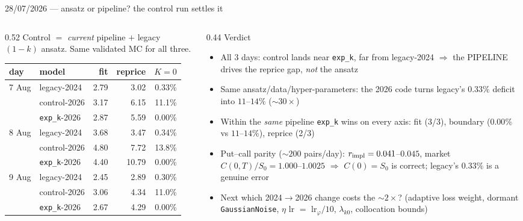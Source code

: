 \documentclass[aspectratio=169,11pt]{beamer}
\newcommand{\gold}[1]{{\color{ntugold}#1}}
\newcommand{\red}[1]{{\color{ntured}#1}}
\begin{document}
\begin{frame}{28/07/2026 --- ansatz or pipeline? the control run settles it}
  \begin{columns}[T]
    \begin{column}{0.52\linewidth}
      \gold{Control} $=$ \emph{current} pipeline $+$ legacy $(1{-}k)$ ansatz.
      Same validated MC for all three.
      \begin{center}\scriptsize
      \begin{tabular}{llrrr}
        \toprule
        day & model & fit & reprice & $K{=}0$ \\
        \midrule
        7 Aug & legacy-2024  & 2.79 & \gold{3.02} & 0.33\% \\
              & control-2026 & 3.17 & \red{6.15}  & 11.1\% \\
              & \texttt{exp\_k}-2026 & 2.87 & \red{5.59} & 0.00\% \\
        \midrule
        8 Aug & legacy-2024  & 3.68 & \gold{3.47} & 0.34\% \\
              & control-2026 & 4.80 & \red{7.72}  & 13.8\% \\
              & \texttt{exp\_k}-2026 & 4.40 & \red{10.79} & 0.00\% \\
        \midrule
        9 Aug & legacy-2024  & 2.45 & \gold{2.89} & 0.30\% \\
              & control-2026 & 3.06 & \red{4.34}  & 11.0\% \\
              & \texttt{exp\_k}-2026 & 2.67 & \red{4.29} & 0.00\% \\
        \bottomrule
      \end{tabular}
      \end{center}
    \end{column}
    \begin{column}{0.44\linewidth}
      \gold{Verdict}
      \begin{itemize}\scriptsize
        \item All 3 days: control lands \red{near \texttt{exp\_k}, far from legacy-2024}
              $\Rightarrow$ the \red{PIPELINE} drives the reprice gap, \emph{not} the ansatz
        \item Same ansatz/data/hyper-parameters: the 2026 code turns legacy's $0.33\%$ deficit into
              \red{$11$--$14\%$} ($\sim\!30\times$)
        \item Within the \emph{same} pipeline \texttt{exp\_k} wins on \gold{every} axis: fit (3/3),
              boundary ($0.00\%$ vs $11$--$14\%$), reprice (2/3)
        \item Put--call parity ($\sim\!200$ pairs/day): $r_{\rm impl}=0.041$--$0.045$,
              market $C(0,T)/S_0=1.000$--$1.0025$ $\Rightarrow$ \gold{$C(0)=S_0$ is correct};
              legacy's $0.33\%$ is a genuine error
        \item \gold{Next} which 2024$\to$2026 change costs the $\sim\!2\times$? (adaptive loss weight,
              dormant \texttt{GaussianNoise}, $\eta$ lr $=$ lr$_\varphi/10$, $\lambda_{k0}$, collocation bounds)
      \end{itemize}
    \end{column}
  \end{columns}
\end{frame}
\end{document}
